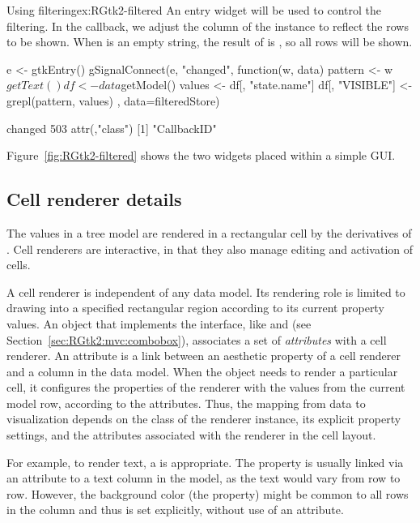 \begin{example}{Using filtering}{ex:RGtk2-filtered}
An entry widget will be used to control the filtering. In the
callback, we adjust the  column of the
 instance to reflect the rows to be shown. When
 is an empty string, the result of  is 
, so all rows will be shown.
\begin{Schunk}
\begin{Sinput}
 e <- gtkEntry()
 gSignalConnect(e, "changed", function(w, data) {
   pattern <- w$getText()
   df <- data$getModel()
   values <- df[, "state.name"]
   df[, "VISIBLE"] <- grepl(pattern, values)
 }, data=filteredStore)
\end{Sinput}
\begin{Soutput}
changed 
    503 
attr(,"class")
[1] "CallbackID"
\end{Soutput}
\end{Schunk}


Figure~\ref{fig:RGtk2-filtered} shows the two widgets placed within a
simple GUI.
\end{example}

\subsection{Cell renderer details}
\label{sec:RGtk2:cellrenderers}

The values in a tree model are rendered in a rectangular cell by the
derivatives of . Cell renderers are
interactive, in that they also manage editing and activation of cells.

A cell renderer is independent of any data model. Its rendering role
is limited to drawing into a specified rectangular region according to
its current property values. An object that implements the
 interface, like  and
 (see Section~\ref{sec:RGtk2:mvc:combobox}),
associates a set of \emph{attributes} with a cell renderer. An
attribute is a link between an aesthetic property of a cell renderer
and a column in the data model. When the  object
needs to render a particular cell, it configures the properties of the
renderer with the values from the current model row, according to the
attributes. Thus, the mapping from data to visualization depends on
the class of the renderer instance, its explicit property settings,
and the attributes associated with the renderer in the cell layout.

For example, to render text, a  is
appropriate. The  property is usually linked via an
attribute to a text column in the model, as the text would vary from
row to row. However, the background color (the 
property) might be common to all rows in the column and thus is set
explicitly, without use of an attribute.

